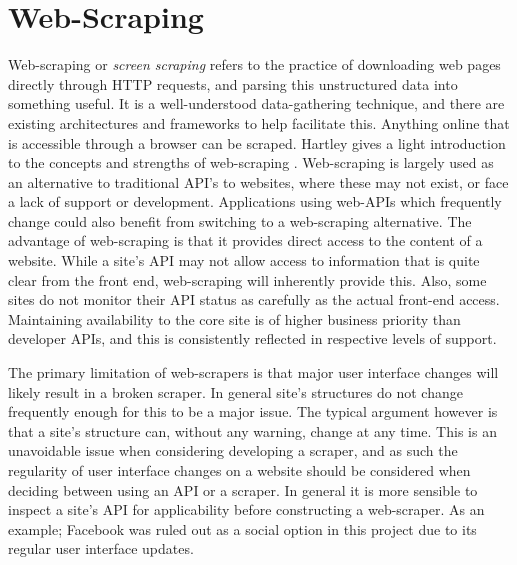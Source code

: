 \section{Web-Scraping}


Web-scraping or \textit{screen scraping} refers to the practice of downloading web pages directly through HTTP requests, and parsing this unstructured data into something useful. It is a well-understood data-gathering technique, and there are existing architectures and frameworks to help facilitate this.  Anything online that is accessible through a browser can be scraped. Hartley gives a light introduction to the concepts and strengths of web-scraping \cite{no_api_for_me}. Web-scraping is largely used as an alternative to traditional API's to websites, where these may not exist, or face a lack of support or development. Applications using web-APIs which frequently change could also benefit from switching to a web-scraping alternative. The advantage of web-scraping is that it provides direct access to the content of a website. While a site's API may not allow access to information that is quite clear from the front end, web-scraping will inherently provide this. Also, some sites do not monitor their API 
status 
as carefully as the actual front-end access. Maintaining availability to the core site is of higher business priority than developer APIs, and this is consistently reflected in respective levels of support. 

The primary limitation of web-scrapers is that major user interface changes will likely result in a broken scraper. In general site's structures do not change frequently enough for this to be a major issue. The typical argument however is that a site's structure can, without any warning, change at any time. This is an unavoidable issue when considering developing a scraper, and as such the regularity of user interface changes on a website should be considered when deciding between using an API or a scraper. In general it is more sensible to inspect a site's API for applicability before constructing a web-scraper. As an example; Facebook was ruled out as a social option in this project due to its regular user interface updates. 

